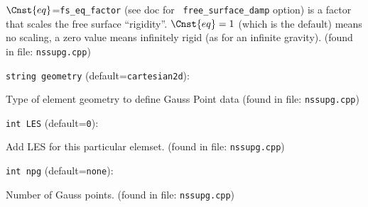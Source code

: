 $\Cnst{eq}$={\tt fs\_eq\_factor} (see doc for {\tt
free\_surface\_damp} option) is a factor that scales the free
surface ``rigidity''. $\Cnst{eq}=1$ (which is the default) means
no scaling, a zero value means infinitely rigid (as for an
infinite gravity).
 (found in file: \verb+nssupg.cpp+)
\item\verb+string geometry+ {\rm(default=\verb|cartesian2d|)}:

Type of element geometry to define Gauss Point data
 (found in file: \verb+nssupg.cpp+)
\item\verb+int LES+ {\rm(default=\verb|0|)}:

Add LES for this particular elemset.
 (found in file: \verb+nssupg.cpp+)
\item\verb+int npg+ {\rm(default=\verb|none|)}:

Number of Gauss points.
 (found in file: \verb+nssupg.cpp+)
